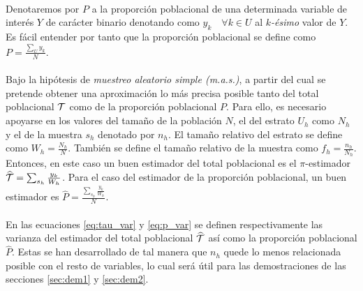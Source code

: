 \documentclass{article}
\begin{document}
    \paragraph{}
    Denotaremos por $P$ a la proporción poblacional de una determinada variable de interés $Y$ de carácter binario denotando como $y_k \quad \forall k \in U$ al \emph{$k$-ésimo} valor de $Y$. Es fácil entender por tanto que la proporción poblacional se define como $P = \frac{\sum_U y_k}{N}$.

    \paragraph{}
    Bajo la hipótesis de \emph{muestreo aleatorio simple (m.a.s.)}, a partir del cual se pretende obtener una aproximación lo más precisa posible tanto del total poblacional $\mathcal{T}$ como de la proporción poblacional $P$. Para ello, es necesario apoyarse en los valores del tamaño de la población $N$, el del estrato $U_h$ como $N_h$ y el de la muestra $s_h$ denotado por $n_h$. El tamaño relativo del estrato se define como $W_h = \frac{N_h}{N}$. También se define el tamaño relativo de la muestra como $f_h = \frac{n_h}{N_h}$. Entonces, en este caso un buen estimador del total poblacional es el $\pi$-estimador $\widehat{\mathcal{T}} = \sum_{s_h} \frac{y_k}{W_h}$. Para el caso del estimador de la proporción poblacional, un buen estimador es $\widehat{P} = \frac{\sum_{s_h} \frac{y_k}{W_h}}{N}$.

    \paragraph{}
    En las ecuaciones \eqref{eq:tau_var} y \eqref{eq:p_var} se definen respectivamente las varianza del estimador del total poblacional $\widehat{\mathcal{T}}$  así como la proporción poblacional $\widehat{P}$. Estas se han desarrollado de tal manera que $n_h$ quede lo menos relacionada posible con el resto de variables, lo cual será útil para las demostraciones de las secciones \ref{sec:dem1} y \ref{sec:dem2}.
\end{document}
